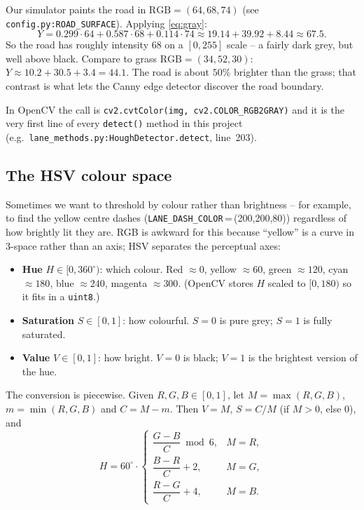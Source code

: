 \begin{example}
Our simulator paints the road in $\text{RGB}=(64,68,74)$ (see
\texttt{config.py:ROAD\_SURFACE}). Applying \eqref{eq:gray}:
\[
Y = 0.299\cdot 64 + 0.587\cdot 68 + 0.114\cdot 74
  \approx 19.14 + 39.92 + 8.44 \approx 67.5.
\]
So the road has roughly intensity 68 on a $[0,255]$ scale -- a fairly
dark grey, but well above black. Compare to grass
$\text{RGB}=(34,52,30)$: $Y\approx 10.2+30.5+3.4 = 44.1$. The road is
about $50\%$ brighter than the grass; that contrast is what lets the
Canny edge detector discover the road boundary.
\end{example}

In OpenCV the call is \texttt{cv2.cvtColor(img, cv2.COLOR\_RGB2GRAY)}
and it is the very first line of every \texttt{detect()} method in
this project (e.g.\ \texttt{lane\_methods.py:HoughDetector.detect},
line~203).

\subsection{The HSV colour space}

Sometimes we want to threshold by colour rather than brightness -- for
example, to find the yellow centre dashes
(\texttt{LANE\_DASH\_COLOR}\,=\,(200,200,80)) regardless of how
brightly lit they are. RGB is awkward for this because ``yellow'' is
a curve in 3-space rather than an axis; HSV separates the perceptual
axes:
\begin{itemize}[leftmargin=1.4em,itemsep=2pt]
  \item \textbf{Hue} $H\in[0,360^\circ)$: which colour. Red $\approx 0$,
        yellow $\approx 60$, green $\approx 120$, cyan $\approx 180$,
        blue $\approx 240$, magenta $\approx 300$. (OpenCV stores $H$
        scaled to $[0,180)$ so it fits in a \texttt{uint8}.)
  \item \textbf{Saturation} $S\in[0,1]$: how colourful. $S=0$ is pure
        grey; $S=1$ is fully saturated.
  \item \textbf{Value} $V\in[0,1]$: how bright. $V=0$ is black; $V=1$
        is the brightest version of the hue.
\end{itemize}
The conversion is piecewise. Given $R,G,B\in[0,1]$, let
$M=\max(R,G,B)$, $m=\min(R,G,B)$ and $C=M-m$. Then $V=M$, $S=C/M$ (if
$M>0$, else $0$), and
\[
H = 60^\circ\cdot
\begin{cases}
   \dfrac{G-B}{C}\bmod 6, & M=R,\\[4pt]
   \dfrac{B-R}{C} + 2,    & M=G,\\[4pt]
   \dfrac{R-G}{C} + 4,    & M=B.
\end{cases}
\]


